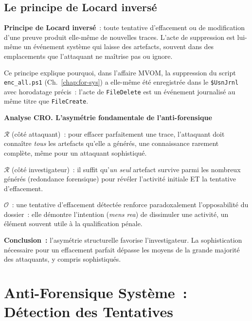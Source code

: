 \subsection{Le principe de Locard inversé}

\begin{boxdef}
\textbf{Principe de Locard inversé}~:
toute tentative d'effacement ou de modification d'une preuve produit
elle-même de nouvelles traces. L'acte de suppression est lui-même
un événement système qui laisse des artefacts, souvent dans des
emplacements que l'attaquant ne maîtrise pas ou ignore.
\end{boxdef}

Ce principe explique pourquoi, dans l'affaire MVOM, la suppression du
script \texttt{enc\_all.ps1} (Ch.~\ref{chap:for-sys}) a elle-même été
enregistrée dans le \texttt{\$UsnJrnl} avec horodatage précis~: l'acte
de \texttt{FileDelete} est un événement journalisé au même titre
que \texttt{FileCreate}.

\begin{boxCRO}
\textbf{Analyse CRO. L'asymétrie fondamentale de l'anti-forensique}

$\mathcal{R}$ (côté attaquant)~: pour effacer parfaitement une trace,
l'attaquant doit connaître \emph{tous} les artefacts qu'elle a générés, une connaissance rarement complète, même pour un attaquant
sophistiqué.

$\mathcal{R}$ (côté investigateur)~: il suffit qu'\emph{un seul}
artefact survive parmi les nombreux générés (redondance forensique)
pour révéler l'activité initiale ET la tentative d'effacement.

$\mathcal{O}$~: une tentative d'effacement détectée renforce
paradoxalement l'opposabilité du dossier~: elle démontre l'intention
(\textit{mens rea}) de dissimuler une activité, un élément
souvent utile à la qualification pénale.


\textbf{Conclusion~:} l'asymétrie structurelle favorise l'investigateur.
La sophistication nécessaire pour un effacement parfait dépasse les
moyens de la grande majorité des attaquants, y compris sophistiqués.
\end{boxCRO}

\section{Anti-Forensique Système~: Détection des Tentatives}
\label{sec:anti-for-systeme}

